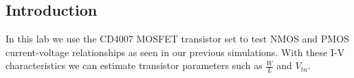 \subsection{Introduction}
In this lab we use the CD4007 MOSFET transistor set to test NMOS and PMOS current-voltage relationships as seen in our previous simulations. With these I-V characteristics we can estimate transistor parameters such as $\frac{W}{L}$ and $V_{tn}$.
